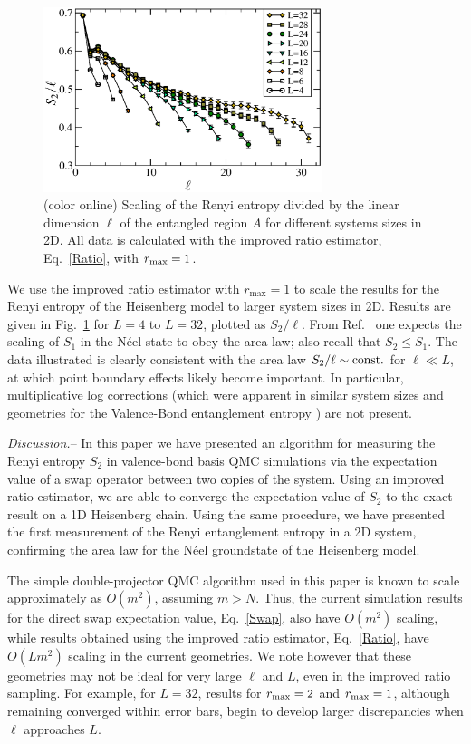 \documentclass[prl,aps,twocolumn,floatfix,amsmath,amssymb,superscriptaddress,tightenlines]{revtex4}
\begin{document}
\begin{figure} {
\includegraphics[width=3.2in]{fig4.eps} \caption{(color online) 
\label{fig4}
Scaling of the Renyi entropy divided by the linear dimension $\ell$ of the entangled region $A$ for different systems sizes
in 2D.  All data is calculated with the improved ratio estimator, Eq.~\eqref{Ratio}, with $r_{\rm max}=1$.  
}
} \end{figure}

We use the improved ratio estimator with $r_{\max}=1$ to scale the results for the Renyi entropy of the Heisenberg model to larger system sizes in 2D.  Results are given in Fig.~\ref{fig4} for $L=4$ to $L=32$, plotted as $S_2/\ell$.  From  Ref.~\cite{Ann}
one expects the scaling of $S_1$ in the N\'eel state to obey the area law; also recall that $S_2 \leq S_1$.  
The data illustrated is clearly consistent with the area law $S_2/\ell
\sim {\rm const.}$ for $\ell \ll L$, at which point boundary 
effects likely become important.  In particular, multiplicative log corrections (which were apparent in similar system sizes and geometries for the Valence-Bond entanglement entropy
\cite{Alet,Chh}) are not present.

{\it Discussion.}-- 
In this paper we have presented an algorithm for measuring the Renyi entropy $S_2$ in valence-bond basis QMC simulations via
the expectation value of a swap operator between two copies of the system.
Using an improved ratio estimator, we are able to converge the expectation value of $S_2$ to the exact
result on a 1D Heisenberg chain.
Using the same procedure, we have presented the first measurement of the Renyi entanglement entropy in a 2D system, confirming the area law for the N\'eel groundstate of the Heisenberg model.

The simple double-projector QMC algorithm used in this paper is known to scale approximately as $O(m^2)$, \cite{AWSloop}
assuming $m >N$.
Thus, the current simulation results for the direct swap expectation
value, Eq.~\eqref{Swap}, also have
 $O(m^2)$ scaling, while results obtained using the improved ratio
estimator, Eq.~\eqref{Ratio}, have $O(Lm^2)$ scaling in the current geometries.
We note however that these geometries may not be ideal for very large $\ell$ and $L$, even in the improved ratio sampling.
For example, for $L=32$, results for $r_{\rm max}=2$ and $r_{\rm max}=1$, 
although remaining converged within error bars,
begin to develop larger discrepancies when $\ell$ approaches $L$.
\end{document}
